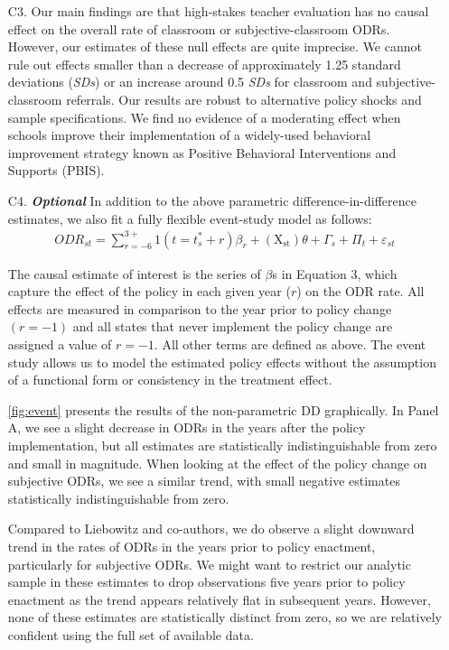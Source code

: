 \documentclass[a4paper, 11pt]{article}
\begin{document}
\begin{enumerate}



	\item[C3.] Our main findings are that high-stakes teacher evaluation has no causal effect on the overall rate of classroom or subjective-classroom ODRs. However, our estimates of these null effects are quite imprecise. We cannot rule out effects smaller than a decrease of approximately 1.25 standard deviations (\textit{SDs}) or an increase around 0.5 \textit{SDs} for classroom and subjective-classroom referrals. Our results are robust to alternative policy shocks and sample specifications. We find no evidence of a moderating effect when schools improve their implementation of a widely-used behavioral improvement strategy known as Positive Behavioral Interventions and Supports (PBIS). 
	
	\item[C4.]  \textbf{\textit{Optional }} In addition to the above parametric difference-in-difference estimates, we also fit a fully flexible event-study model as follows:
\begin{equation} \label{eq:3}
\begin{aligned}
ODR_{st}=\sum_{r=-6}^{3+} 1\left(t=t_{s}^{*}+r\right) \beta_{r}+\left(\mathrm{X}_{\mathrm{st}}\right) \theta+\Gamma_{s}+\Pi_{t}+\varepsilon_{st}
\end{aligned}
\end{equation}

The causal estimate of interest is the series of $\beta$s in Equation 3, which capture the effect of the policy in each given year ($r$) on the ODR rate. All effects are measured in comparison to the year prior to policy change $(r = -1)$ and all states that never implement the policy change are assigned a value of $r = -1$. All other terms are defined as above. The event study allows us to model the estimated policy effects without the assumption of a functional form or consistency in the treatment effect. 

\autoref{fig:event} presents the results of the non-parametric DD graphically. In Panel A, we see a slight decrease in ODRs in the years after the policy implementation, but all estimates are statistically indistinguishable from zero and small in magnitude. When looking at the effect of the policy change on subjective ODRs, we see a similar trend, with small negative estimates statistically indistinguishable from zero. 

Compared to Liebowitz and co-authors, we do observe a slight downward trend in the rates of ODRs in the years prior to policy enactment, particularly for subjective ODRs. We might want to restrict our analytic sample in these estimates to drop observations five years prior to policy enactment as the trend appears relatively flat in subsequent years. However, none of these estimates are statistically distinct from zero, so we are relatively confident using the full set of available data.



\end{enumerate}
\end{document}
